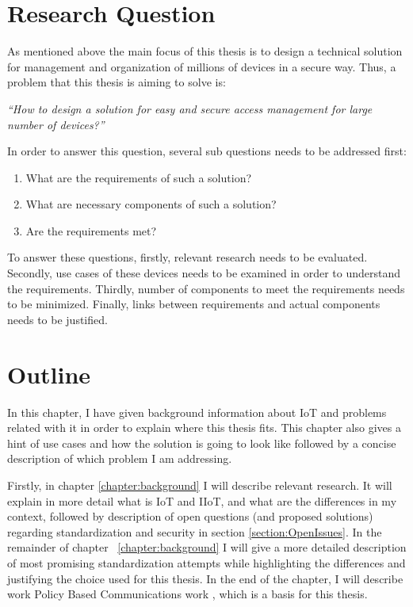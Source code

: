 \section{Research Question}
\label{section:researchQuestion}

As mentioned above the main focus of this thesis is to design a technical solution for management and organization of millions of devices in a secure way. Thus, a problem that this thesis is aiming to solve is:

\begin{center}
\emph{``How to design a solution for easy and secure access management for large number of devices?''}
\end{center}

In order to answer this question, several sub questions needs to be addressed first:

\begin{enumerate}
	\setlength{\itemsep}{1pt}
	\item What are the requirements of such a solution?
	\item What are necessary components of such a solution?
	\item Are the requirements met?
\end{enumerate}

To answer these questions, firstly, relevant research needs to be evaluated. Secondly, use cases of these devices needs to be examined in order to understand the requirements. Thirdly, number of components to meet the requirements needs to be minimized. Finally, links between requirements and actual components needs to be justified.

\section{Outline}

In this chapter, I have given background information about IoT and problems related with it in order to explain where this thesis fits. This chapter also gives a hint of use cases and how the solution is going to look like followed by a concise description of which problem I am addressing.

Firstly, in chapter \ref{chapter:background} I will describe relevant research. It will explain in more detail what is IoT and IIoT, and what are the differences in my context, followed by description of open questions (and proposed solutions) regarding standardization and security in section \ref{section:OpenIssues}. In the remainder of chapter ~\ref{chapter:background} I will give a more detailed description of most promising standardization attempts while highlighting the differences and justifying the choice used for this thesis. In the end of the chapter, I will describe work Policy Based Communications work \cite{Kantola,5480987}, which is a basis for this thesis.

